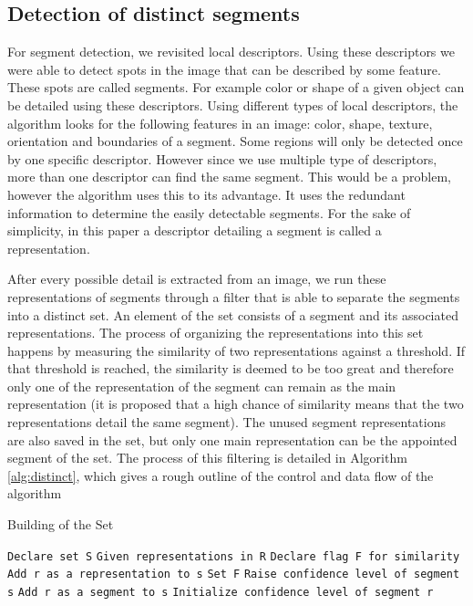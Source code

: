 \subsection{Detection of distinct segments} %
For segment detection, we revisited local descriptors. Using these descriptors we were able to detect spots in the image that can be described by some feature. These spots are called segments. For example color or shape of a given object can be detailed using these descriptors. Using different types of local descriptors, the algorithm looks for the following features in an image: color, shape, texture, orientation and boundaries of a segment. Some regions will only be detected once by one specific descriptor. However since we use multiple type of descriptors, more than one descriptor can find the same segment. This would be a problem, however the algorithm uses this to its advantage. It uses the redundant information to determine the easily detectable segments. For the sake of simplicity, in this paper a descriptor detailing a segment is called a representation.

After every possible detail is extracted from an image, we run these representations of segments through a filter that is able to separate the segments into a distinct set. An element of the set consists of a segment and its associated representations. The process of organizing the representations into this set happens by measuring the similarity of two representations against a threshold. If that threshold is reached, the similarity is deemed to be too great and therefore only one of the representation of the segment can remain as the main representation (it is proposed that a high chance of similarity means that the two representations detail the same segment). The unused segment representations are also saved in the set, but only one main representation can be the appointed segment of the set. The process of this filtering is detailed in Algorithm \ref{alg:distinct}, which gives a rough outline of the control and data flow of the algorithm

\begin{algorithm}
\caption{Building of the Set}\label{alg:distinct}
\begin{algorithmic}
    \State \texttt{Declare set S}
    \State \texttt{Given representations in R}
        \State \texttt{Declare flag F for similarity}
                \State \texttt{Add r as a representation to s}
                \State \texttt{Set F}
                \State \texttt{Raise confidence level of segment s}
            \EndIf
        \EndFor
            \State \texttt{Add r as a segment to s}
            \State \texttt{Initialize confidence level of segment r}
        \EndIf
    \EndFor
\end{algorithmic}
\end{algorithm}


